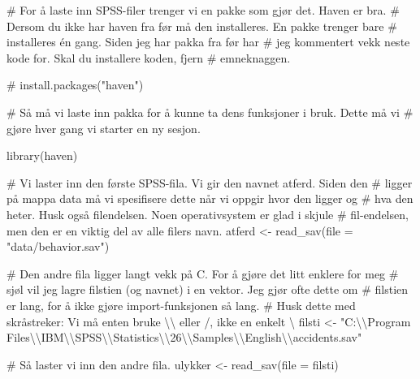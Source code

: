 \documentclass[
  letterpaper,
  DIV=11,
  numbers=noendperiod]{scrartcl}
\newenvironment{Shaded}{\begin{snugshade}}{\end{snugshade}}
\newcommand{\AttributeTok}[1]{\textcolor[rgb]{0.40,0.45,0.13}{#1}}
\newcommand{\CommentTok}[1]{\textcolor[rgb]{0.37,0.37,0.37}{#1}}
\newcommand{\FunctionTok}[1]{\textcolor[rgb]{0.28,0.35,0.67}{#1}}
\newcommand{\NormalTok}[1]{\textcolor[rgb]{0.00,0.23,0.31}{#1}}
\newcommand{\OtherTok}[1]{\textcolor[rgb]{0.00,0.23,0.31}{#1}}
\newcommand{\SpecialCharTok}[1]{\textcolor[rgb]{0.37,0.37,0.37}{#1}}
\newcommand{\StringTok}[1]{\textcolor[rgb]{0.13,0.47,0.30}{#1}}
\begin{document}
\begin{Shaded}
\begin{Highlighting}[]
\CommentTok{\# For å laste inn SPSS{-}filer trenger vi en pakke som gjør det. Haven er bra.}
\CommentTok{\# Dersom du ikke har haven fra før må den installeres. En pakke trenger bare }
\CommentTok{\# installeres  én gang. Siden jeg har pakka fra før har}
\CommentTok{\# jeg kommentert vekk neste kode for. Skal du installere koden, fjern }
\CommentTok{\# emneknaggen.}

\CommentTok{\# install.packages("haven")}

\CommentTok{\# Så må vi laste inn pakka for å kunne ta dens funksjoner i bruk. Dette må vi}
\CommentTok{\# gjøre hver gang vi starter en ny sesjon.}

\FunctionTok{library}\NormalTok{(haven)}

\CommentTok{\# Vi laster inn den første SPSS{-}fila. Vi gir den navnet atferd. Siden den }
\CommentTok{\# ligger på mappa data må vi spesifisere dette når vi oppgir hvor den ligger og}
\CommentTok{\# hva den heter. Husk også filendelsen. Noen operativsystem er glad i skjule }
\CommentTok{\# fil{-}endelsen, men den er en viktig del av alle filers navn.}
\NormalTok{atferd }\OtherTok{\textless{}{-}} \FunctionTok{read\_sav}\NormalTok{(}\AttributeTok{file =} \StringTok{"data/behavior.sav"}\NormalTok{)}

\CommentTok{\# Den andre fila ligger langt vekk på C. For å gjøre det litt enklere for meg}
\CommentTok{\# sjøl vil jeg lagre filstien (og navnet) i en vektor. Jeg gjør ofte dette om }
\CommentTok{\# filstien er lang, for å ikke gjøre import{-}funksjonen så lang.}
\CommentTok{\# Husk dette med skråstreker: Vi må enten bruke \textbackslash{}\textbackslash{} eller /, ikke en enkelt \textbackslash{}}
\NormalTok{filsti }\OtherTok{\textless{}{-}} \StringTok{"C:}\SpecialCharTok{\textbackslash{}\textbackslash{}}\StringTok{Program Files}\SpecialCharTok{\textbackslash{}\textbackslash{}}\StringTok{IBM}\SpecialCharTok{\textbackslash{}\textbackslash{}}\StringTok{SPSS}\SpecialCharTok{\textbackslash{}\textbackslash{}}\StringTok{Statistics}\SpecialCharTok{\textbackslash{}\textbackslash{}}\StringTok{26}\SpecialCharTok{\textbackslash{}\textbackslash{}}\StringTok{Samples}\SpecialCharTok{\textbackslash{}\textbackslash{}}\StringTok{English}\SpecialCharTok{\textbackslash{}\textbackslash{}}\StringTok{accidents.sav"}

\CommentTok{\# Så laster vi inn den andre fila. }
\NormalTok{ulykker }\OtherTok{\textless{}{-}} \FunctionTok{read\_sav}\NormalTok{(}\AttributeTok{file =}\NormalTok{ filsti)}


\end{Highlighting}
\end{Shaded}
\end{document}
